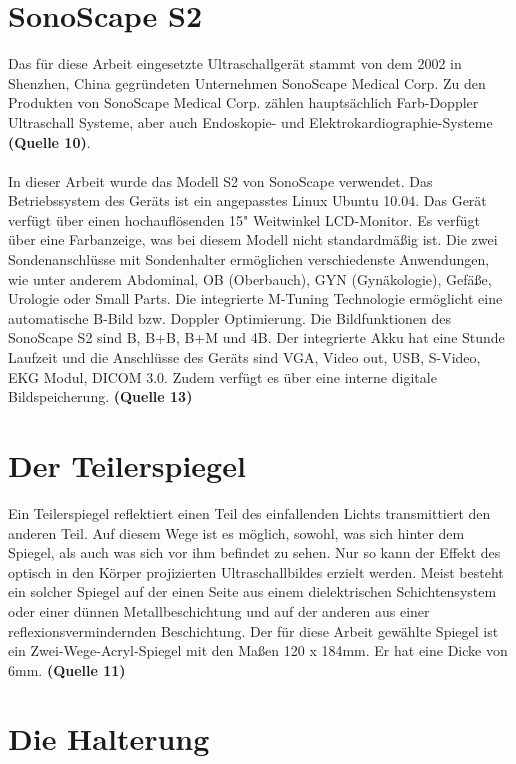 \section{SonoScape S2}

Das für diese Arbeit eingesetzte Ultraschallgerät stammt von dem 2002 in Shenzhen, China gegründeten Unternehmen SonoScape Medical Corp. Zu den Produkten von SonoScape Medical Corp. zählen hauptsächlich Farb-Doppler Ultraschall Systeme, aber auch Endoskopie- und Elektrokardiographie-Systeme \textbf{(Quelle 10)}.
\\
\\
In dieser Arbeit wurde das Modell S2 von SonoScape verwendet. Das Betriebssystem des Geräts ist ein angepasstes Linux Ubuntu 10.04. Das Gerät verfügt über einen hochauflösenden 15" Weitwinkel LCD-Monitor. Es verfügt über eine Farbanzeige, was bei diesem Modell nicht standardmäßig ist. Die zwei Sondenanschlüsse mit Sondenhalter ermöglichen verschiedenste Anwendungen, wie unter anderem Abdominal, OB (Oberbauch), GYN (Gynäkologie), Gefäße, Urologie oder Small Parts. Die integrierte M-Tuning Technologie ermöglicht eine automatische B-Bild bzw. Doppler Optimierung. Die Bildfunktionen des SonoScape S2 sind B, B+B, B+M und 4B. Der integrierte Akku hat eine Stunde Laufzeit und die Anschlüsse des Geräts sind VGA, Video out, USB, S-Video, EKG Modul, DICOM 3.0. Zudem verfügt es über eine interne digitale Bildspeicherung. \textbf{(Quelle 13)}

\section{Der Teilerspiegel}

Ein Teilerspiegel reflektiert einen Teil des einfallenden Lichts transmittiert den anderen Teil. Auf diesem Wege ist es möglich, sowohl, was sich hinter dem Spiegel, als auch was sich vor ihm befindet zu sehen. Nur so kann der Effekt des optisch in den Körper projizierten Ultraschallbildes erzielt werden. Meist besteht ein solcher Spiegel auf der einen Seite aus einem dielektrischen Schichtensystem oder einer dünnen Metallbeschichtung und auf der anderen aus einer reflexionsvermindernden Beschichtung. Der für diese Arbeit gewählte Spiegel ist ein Zwei-Wege-Acryl-Spiegel mit den Maßen 120 x 184mm. Er hat eine Dicke von 6mm. \textbf{(Quelle 11)}

\section{Die Halterung}


